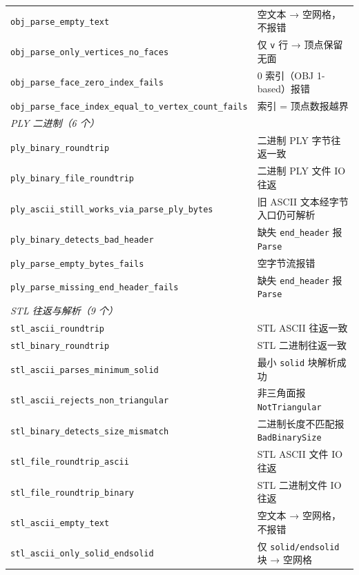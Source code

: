 \documentclass[11pt,a4paper]{article}
\begin{document}
\begin{longtable}{@{}ll@{}}
  \texttt{obj\_parse\_empty\_text}                   & 空文本 → 空网格，不报错 \\
  \texttt{obj\_parse\_only\_vertices\_no\_faces}     & 仅 \texttt{v} 行 → 顶点保留无面 \\
  \texttt{obj\_parse\_face\_zero\_index\_fails}      & 0 索引（OBJ 1-based）报错 \\
  \texttt{obj\_parse\_face\_index\_equal\_to\_vertex\_count\_fails} & 索引 = 顶点数报越界 \\
  \midrule
  \multicolumn{2}{l}{\textit{PLY 二进制（6 个）}} \\
  \texttt{ply\_binary\_roundtrip}                    & 二进制 PLY 字节往返一致 \\
  \texttt{ply\_binary\_file\_roundtrip}              & 二进制 PLY 文件 IO 往返 \\
  \texttt{ply\_ascii\_still\_works\_via\_parse\_ply\_bytes} & 旧 ASCII 文本经字节入口仍可解析 \\
  \texttt{ply\_binary\_detects\_bad\_header}         & 缺失 \texttt{end\_header} 报 \texttt{Parse} \\
  \texttt{ply\_parse\_empty\_bytes\_fails}           & 空字节流报错 \\
  \texttt{ply\_parse\_missing\_end\_header\_fails}   & 缺失 \texttt{end\_header} 报 \texttt{Parse} \\
  \midrule
  \multicolumn{2}{l}{\textit{STL 往返与解析（9 个）}} \\
  \texttt{stl\_ascii\_roundtrip}                     & STL ASCII 往返一致 \\
  \texttt{stl\_binary\_roundtrip}                    & STL 二进制往返一致 \\
  \texttt{stl\_ascii\_parses\_minimum\_solid}        & 最小 \texttt{solid} 块解析成功 \\
  \texttt{stl\_ascii\_rejects\_non\_triangular}      & 非三角面报 \texttt{NotTriangular} \\
  \texttt{stl\_binary\_detects\_size\_mismatch}      & 二进制长度不匹配报 \texttt{BadBinarySize} \\
  \texttt{stl\_file\_roundtrip\_ascii}               & STL ASCII 文件 IO 往返 \\
  \texttt{stl\_file\_roundtrip\_binary}              & STL 二进制文件 IO 往返 \\
  \texttt{stl\_ascii\_empty\_text}                   & 空文本 → 空网格，不报错 \\
  \texttt{stl\_ascii\_only\_solid\_endsolid}         & 仅 \texttt{solid/endsolid} 块 → 空网格 \\

\end{longtable}
\end{document}
